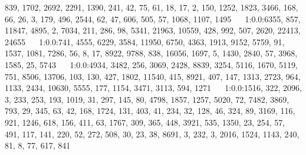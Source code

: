\documentclass[a4paper,11pt,oneside]{book}
\begin{document}
839, 1702, 2692, 2291, 1390, 241, 42, 75, 61, 18, 17, 2, 150, 1252, 1823, 3466, 168, 66, 26, 3, 179, 496, 2544, 62, 47, 606, 505, 57, 1068, 1107, 1495	$\quad$	1:0.0:6355, 857, 11847, 4895, 2, 7034, 211, 286, 98, 5341, 21963, 10559, 428, 992, 507, 2620, 22413, 24655	$\quad$	1:0.0:741, 4555, 6229, 3584, 11950, 6750, 4363, 1913, 9152, 5759, 91, 1537, 1081, 7286, 56, 8, 17, 8922, 9788, 838, 16056, 1697, 5, 1430, 2840, 57, 3968, 1585, 25, 5743	$\quad$	1:0.0:4934, 3482, 256, 3069, 2428, 8839, 3254, 5116, 1670, 5119, 751, 8506, 13706, 103, 130, 427, 1802, 11540, 415, 8921, 407, 147, 1313, 2723, 964, 1133, 2434, 10630, 5555, 177, 1154, 3471, 3113, 594, 1271	$\quad$	1:0.0:1516, 322, 2096, 3, 233, 253, 193, 1019, 31, 297, 145, 80, 4798, 1857, 1257, 5020, 72, 7482, 3869, 793, 29, 345, 63, 42, 168, 1724, 131, 403, 41, 234, 32, 128, 46, 324, 89, 3169, 116, 921, 1246, 618, 156, 411, 63, 1767, 309, 365, 448, 3921, 535, 1350, 23, 254, 57, 491, 117, 141, 220, 52, 272, 508, 30, 23, 38, 8691, 3, 232, 3, 2016, 1524, 1143, 240, 81, 8, 77, 617, 841	$\quad$	
\end{document}
